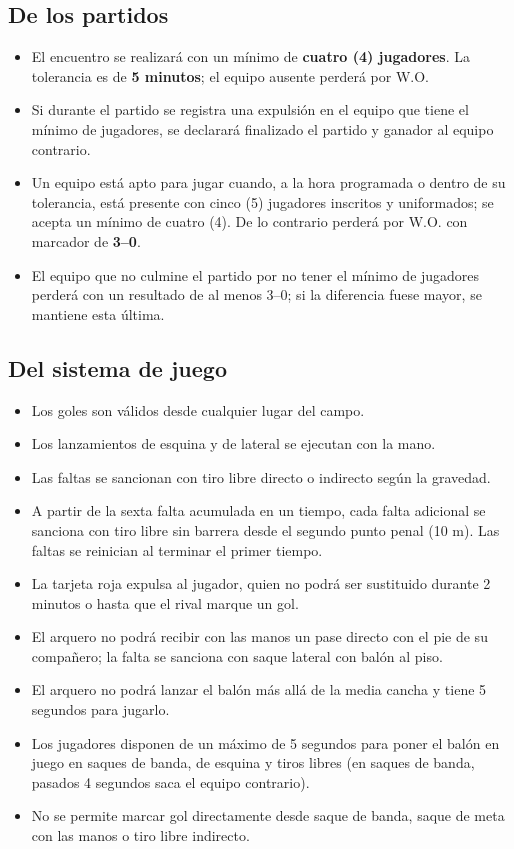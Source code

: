 	\subsection{De los partidos}

	\begin{itemize}
		\item El encuentro se realizará con un mínimo de \textbf{cuatro (4) jugadores}. La tolerancia es de \textbf{5 minutos}; el equipo ausente perderá por W.O.
		\item Si durante el partido se registra una expulsión en el equipo que tiene el mínimo de jugadores, se declarará finalizado el partido y ganador al equipo contrario.
		\item Un equipo está apto para jugar cuando, a la hora programada o dentro de su tolerancia, está presente con cinco (5) jugadores inscritos y uniformados; se acepta un mínimo de cuatro (4). De lo contrario perderá por W.O. con marcador de \textbf{3--0}.
		\item El equipo que no culmine el partido por no tener el mínimo de jugadores perderá con un resultado de al menos 3--0; si la diferencia fuese mayor, se mantiene esta última.
	\end{itemize}

	\subsection{Del sistema de juego}

	\begin{itemize}
		\item Los goles son válidos desde cualquier lugar del campo.
		\item Los lanzamientos de esquina y de lateral se ejecutan con la mano.
		\item Las faltas se sancionan con tiro libre directo o indirecto según la gravedad.
		\item A partir de la sexta falta acumulada en un tiempo, cada falta adicional se sanciona con tiro libre sin barrera desde el segundo punto penal (10 m). Las faltas se reinician al terminar el primer tiempo.
		\item La tarjeta roja expulsa al jugador, quien no podrá ser sustituido durante 2 minutos o hasta que el rival marque un gol.
		\item El arquero no podrá recibir con las manos un pase directo con el pie de su compañero; la falta se sanciona con saque lateral con balón al piso.
		\item El arquero no podrá lanzar el balón más allá de la media cancha y tiene 5 segundos para jugarlo.
		\item Los jugadores disponen de un máximo de 5 segundos para poner el balón en juego en saques de banda, de esquina y tiros libres (en saques de banda, pasados 4 segundos saca el equipo contrario).
		\item No se permite marcar gol directamente desde saque de banda, saque de meta con las manos o tiro libre indirecto.
	\end{itemize}

